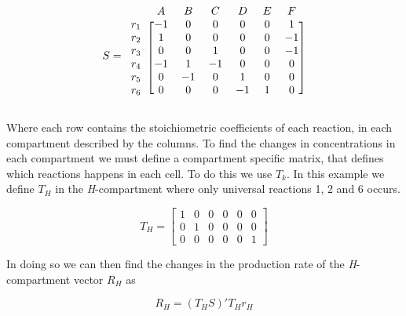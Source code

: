 \documentclass{IEEEtran}
\begin{document}
\begin{equation}
\label{eq:stoi_example}
S =
\begin{blockarray}{l c c c c c c}
\begin{block}{l c c c c c c}
& A & B & C & D & E & F & \\
\end{block}
\begin{block}{l [c c c c c c]}
r_1 & -1 & 0  & 0  & 0  & 0 & 1 \\
r_2 & 1  & 0  & 0  & 0  & 0 & -1 \\
r_3 & 0  & 0  & 1  & 0  & 0 & -1 \\
r_4 & -1 & 1  & -1 & 0  & 0 &  0 \\
r_5 & 0  & -1 & 0  & 1  & 0 & 0 \\
r_6 & 0  & 0  & 0  & -1 & 1 & 0 \\
\end{block}
\end{blockarray}
\end{equation}


Where each row contains the stoichiometric coefficients of each reaction, in each compartment described by the columns. To find the changes in concentrations in each compartment we must define a compartment specific matrix, that defines which reactions happens in each cell. To do this we use $T_k$. In this example we define $T_H$ in the \textit{H}-compartment where only universal reactions 1, 2 and 6 occurs.


\begin{equation}
    T_H = 
    \begin{bmatrix}
        1 & 0 & 0 & 0 & 0 & 0 \\
        0 & 1 & 0 & 0 & 0 & 0 \\
        0 & 0 & 0 & 0 & 0 & 1
    \end{bmatrix}
\end{equation}

In doing so we can then find the changes in the production rate of the \textit{H}-compartment vector $R_H$ as

 
\begin{equation}
    R_H =  (T_HS)'T_Hr_H 
\end{equation}
\end{document}
